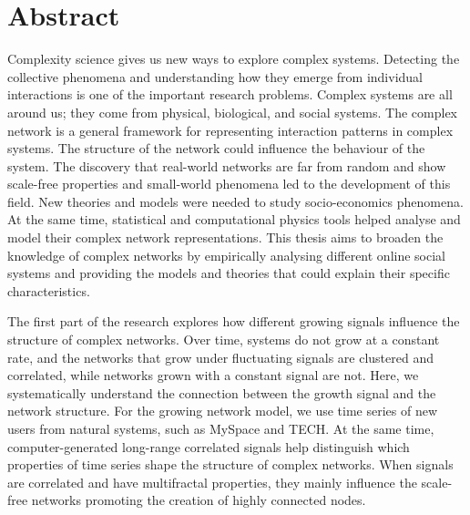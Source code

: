 
\normalsize


\chapter{Abstract}

Complexity science gives us new ways to explore complex systems. Detecting the collective phenomena and understanding how they emerge from individual interactions is one of the important research problems. Complex systems are all around us; they come from physical, biological, and social systems. The complex network is a general framework for representing interaction patterns in complex systems. The structure of the network could influence the behaviour of the system. The discovery that real-world networks are far from random and show scale-free properties and small-world phenomena led to the development of this field. New theories and models were needed to study socio-economics phenomena. At the same time, statistical and computational physics tools helped analyse and model their complex network representations. %
This thesis aims to broaden the knowledge of complex networks by empirically analysing different online social systems and providing the models and theories that could explain their specific characteristics.  

The first part of the research explores how different growing signals influence the structure of complex networks. Over time, systems do not grow at a constant rate, and the networks that grow under fluctuating signals are clustered and correlated, while networks grown with a constant signal are not. Here, we systematically understand the connection between the growth signal and the network structure. For the growing network model, we use time series of new users from natural systems, such as MySpace and TECH. At the same time, computer-generated long-range correlated signals help distinguish which properties of time series shape the structure of complex networks. When signals are correlated and have multifractal properties, they mainly influence the scale-free networks promoting the creation of highly connected nodes. 

